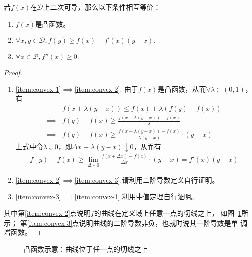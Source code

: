 \begin{theorem}
  若$f(x)$在$\mathcal{D}$上二次可导，那么以下条件相互等价：
  \begin{enumerate}
  \item \label{item:convex-1} $f(x)$是凸函数。
  \item \label{item:convex-2} $\forall x,y\in\mathcal{D}, f(y)\ge f(x)+f'(x)(y-x).$
  \item \label{item:convex-3} $\forall x\in\mathcal{D}, f''(x)\ge 0.$
  \end{enumerate}
\end{theorem}
\begin{proof}
  \begin{enumerate}
  \item \ref{item:convex-1}$\implies$\ref{item:convex-2}. 由于$f(x)$是凸函数，从而$\forall\lambda\in(0,1)$，有
    \begin{align*}
      &f\left(x+\lambda(y-x)\right)\le f(x)+\lambda\left(f(y)-f(x)\right)\\
      \implies & f(y)-f(x)\ge \frac{f\left(x+\lambda(y-x)\right) -  f(x)}{\lambda}\\
      \implies & f(y)-f(x)\ge \frac{f\left(x+\lambda(y-x)\right) -  f(x)}{\lambda(y-x)}\cdot(y-x)
    \end{align*}
    上式中令$\lambda\downarrow 0$，即$\Delta x\equiv\lambda(y-x)\downarrow 0$，从而有
    \begin{align*}
      f(y)-f(x)\ge \lim_{\Delta\downarrow 0}\frac{f(x+\Delta x) -  f(x)}{\Delta x}\cdot(y-x) = f'(x)(y-x)
    \end{align*}
  \item \ref{item:convex-2}$\implies$\ref{item:convex-3}.\think 请利用二阶导数定义自行证明。
  \item \ref{item:convex-3}$\implies$\ref{item:convex-1}.\think 利用中值定理自行证明。
  \end{enumerate}
  \note
  其中第\ref{item:convex-2}点说明$f$的曲线在定义域上任意一点的切线之上，
  如图~\ref{fig:convex-function-above-tangent-line}所示；
  第\ref{item:convex-3}点说明曲线的二阶导数非负，也就时说其一阶导数是单
  调增函数。
\end{proof}

\begin{figure}[htb]
  \centering
  \caption{凸函数示意：曲线位于任一点的切线之上}
  \label{fig:convex-function-above-tangent-line}
\end{figure}


